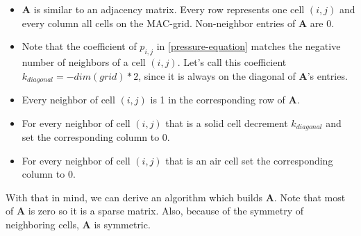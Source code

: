 \begin{itemize}
      \item $\mathbf{A}$ is similar to an adjacency matrix. Every row represents one cell $(i,j)$ and every column all cells on the MAC-grid. Non-neighbor entries of $\mathbf{A}$ are 0.
      \item Note that the coefficient of $p_{i,j}$ in \ref{pressure-equation} matches the negative number of neighbors of a cell $(i,j)$. Let's call this coefficient $k_{diagonal} = -dim(grid) * 2$, since it is always on the diagonal of $\mathbf{A}$'s entries.
      \item Every neighbor of cell $(i,j)$ is 1 in the corresponding row of $\mathbf{A}$.
      \item For every neighbor of cell $(i,j)$ that is a solid cell decrement $k_{diagonal}$ and set the corresponding column to 0.
      \item For every neighbor of cell $(i,j)$ that is an air cell set the corresponding column to 0.
\end{itemize}
With that in mind, we can derive an algorithm which builds $\mathbf{A}$. Note that most of $\mathbf{A}$ is zero so it is a sparse matrix. Also, because of the symmetry of neighboring cells, $\mathbf{A}$ is symmetric.

